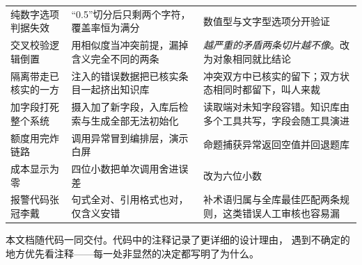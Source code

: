 \begin{longtable}{@{}p{2.6cm}p{4.4cm}p{5.4cm}@{}}
纯数字选项判据失效 & “0.5”切分后只剩两个字符，覆盖率恒为满分 &
数值型与文字型选项分开验证 \\

交叉校验逻辑倒置 & 用相似度当冲突前提，漏掉含义完全不同的两条 &
\emph{越严重的矛盾两条切片越不像}。改为对象相同就比结论 \\

隔离带走已核实的一方 & 注入的错误数据把已核实条目一起挤出知识库 &
冲突双方中已核实的留下；双方状态相同时都留下，叫人来裁 \\

加字段打死整个系统 & 摄入加了新字段，入库后检索与生成全部无法初始化 &
读取端对未知字段容错。知识库由多个工具共写，字段会随工具演进 \\

额度用完炸链路 & 调用异常冒到编排层，演示白屏 &
命题捕获异常返回空值并回退题库 \\

成本显示为零 & 四位小数把单次调用舍进误差 &
改为六位小数 \\

报警代码张冠李戴 & 句式全对、引用格式也对，仅含义安错 &
补术语归属与全库最佳匹配两条规则，这类错误人工审核也容易漏 \\

\end{longtable}

\vspace{6pt}
\noindent
本文档随代码一同交付。代码中的注释记录了更详细的设计理由，
遇到不确定的地方优先看注释——每一处非显然的决定都写明了为什么。
